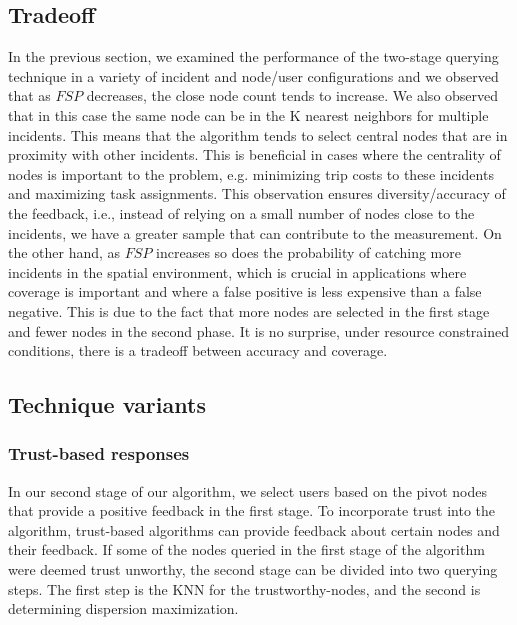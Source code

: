 \documentclass{acm_proc_article-sp}
\begin{document}
\subsection{Tradeoff}
In the previous section, we examined the performance of the two-stage querying technique in a variety of incident and node/user configurations and we observed that as $FSP$ decreases, the close node count tends to increase. We also observed that in this case the same node can be in the K nearest neighbors for multiple incidents. This means that the algorithm tends to select central nodes that are in proximity with other incidents. This is beneficial in cases where the centrality of nodes is important to the problem, e.g. minimizing trip costs to these incidents and maximizing task assignments. This observation ensures diversity/accuracy of the feedback, i.e., instead of relying on a small number of nodes close to the incidents, we have a greater sample that can contribute to the measurement.
On the other hand, as $FSP$ increases so does the probability of catching more incidents in the spatial environment, which is crucial in applications where coverage is important and where a false positive is less expensive than a false negative. This is due to the fact that more nodes are selected in the first stage and fewer nodes in the second phase. It is no surprise, under resource constrained conditions, there is a tradeoff between accuracy and coverage.

\subsection{Technique variants}
\subsubsection{Trust-based responses}
In our second stage of our algorithm, we select users based on the pivot nodes that provide a positive feedback in the first stage. To incorporate trust into the algorithm, trust-based algorithms can provide feedback about certain nodes and their feedback. If some of the nodes queried in the first stage of the algorithm were deemed trust unworthy, the second stage can be divided into two querying steps. The first step is the KNN for the trustworthy-nodes, and the second is determining dispersion maximization. 
\end{document}
